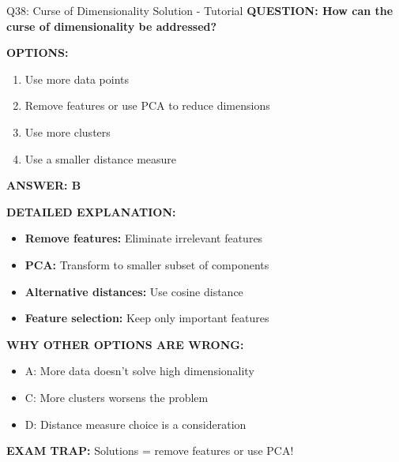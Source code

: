 \documentclass[8pt]{beamer}
\begin{document}
	\begin{frame}{Q38: Curse of Dimensionality Solution - Tutorial}
		\fontsize{6.5}{7.5}\selectfont
		\textbf{QUESTION: How can the curse of dimensionality be addressed?}
		
		\vspace{0.1cm}
		\textbf{OPTIONS:}
		\begin{enumerate}
			\item Use more data points
			\item Remove features or use PCA to reduce dimensions
			\item Use more clusters
			\item Use a smaller distance measure
		\end{enumerate}
		
		\vspace{0.1cm}
		\textcolor{myblue}{\textbf{ANSWER: B}}
		
		\vspace{0.1cm}
		\textbf{DETAILED EXPLANATION:}
		\begin{itemize}
			\item \textbf{Remove features:} Eliminate irrelevant features
			\item \textbf{PCA:} Transform to smaller subset of components
			\item \textbf{Alternative distances:} Use cosine distance
			\item \textbf{Feature selection:} Keep only important features
		\end{itemize}
		
		\vspace{0.1cm}
		\textcolor{myred}{\textbf{WHY OTHER OPTIONS ARE WRONG:}}
		\begin{itemize}
			\item \textcolor{myred}{A:} More data doesn't solve high dimensionality
			\item \textcolor{myred}{C:} More clusters worsens the problem
			\item \textcolor{myred}{D:} Distance measure choice is a consideration
		\end{itemize}
		
		\textcolor{myred}{\textbf{EXAM TRAP:}} Solutions = \textcolor{myblue}{remove features or use PCA}!
	\end{frame}
	
\end{document}
